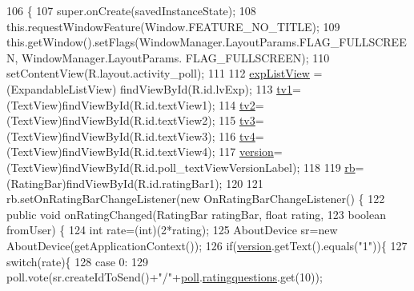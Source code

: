 \begin{DoxyCode}
106                                                        \{
107         super.onCreate(savedInstanceState);
108         this.requestWindowFeature(Window.FEATURE\_NO\_TITLE);
109         this.getWindow().setFlags(WindowManager.LayoutParams.FLAG\_FULLSCREEN, WindowManager.LayoutParams.
      FLAG\_FULLSCREEN);
110         setContentView(R.layout.activity\_poll);
111         
112         \hyperlink{classcom_1_1example_1_1qrpoll_1_1_poll_activity_a45d9887fce62772f80726024d1775f7d}{expListView} = (ExpandableListView) findViewById(R.id.lvExp);
113         \hyperlink{classcom_1_1example_1_1qrpoll_1_1_poll_activity_a7928323c2d0f40aa25420488718de309}{tv1}=(TextView)findViewById(R.id.textView1);
114         \hyperlink{classcom_1_1example_1_1qrpoll_1_1_poll_activity_a48f7da0dc1da430cd5ac90a8376cad70}{tv2}=(TextView)findViewById(R.id.textView2);
115         \hyperlink{classcom_1_1example_1_1qrpoll_1_1_poll_activity_a70708751ea7eb8a32569447a087471b8}{tv3}=(TextView)findViewById(R.id.textView3);
116         \hyperlink{classcom_1_1example_1_1qrpoll_1_1_poll_activity_a32c7797e7d6cdf269f9449cfdb635438}{tv4}=(TextView)findViewById(R.id.textView4);
117         \hyperlink{classcom_1_1example_1_1qrpoll_1_1_poll_activity_a4fbbfc95809c5aa0bf9916316730a992}{version}=(TextView)findViewById(R.id.poll\_textViewVersionLabel);
118         
119         \hyperlink{classcom_1_1example_1_1qrpoll_1_1_poll_activity_a3c2b3e0864209b0253263a7af2642a13}{rb}=(RatingBar)findViewById(R.id.ratingBar1);
120         
121         rb.setOnRatingBarChangeListener(\textcolor{keyword}{new} OnRatingBarChangeListener() \{
122             \textcolor{keyword}{public} \textcolor{keywordtype}{void} onRatingChanged(RatingBar ratingBar, \textcolor{keywordtype}{float} rating,
123                     \textcolor{keywordtype}{boolean} fromUser) \{
124                 \textcolor{keywordtype}{int} rate=(int)(2*rating);
125                 AboutDevice sr=\textcolor{keyword}{new} AboutDevice(getApplicationContext());
126                 \textcolor{keywordflow}{if}(\hyperlink{classcom_1_1example_1_1qrpoll_1_1_poll_activity_a4fbbfc95809c5aa0bf9916316730a992}{version}.getText().equals(\textcolor{stringliteral}{"1"}))\{
127                 \textcolor{keywordflow}{switch}(rate)\{
128                 \textcolor{keywordflow}{case} 0:
129                     poll.vote(sr.createIdToSend()+\textcolor{stringliteral}{"/"}+\hyperlink{classcom_1_1example_1_1qrpoll_1_1_poll_activity_accbd807fe57852d64377c5a96401c376}{poll}.\hyperlink{classcom_1_1example_1_1qrpoll_1_1_poll_a357dc2acb9f42f2bee8dd88556551637}{ratingquestions}.get(10));

\end{DoxyCode}
